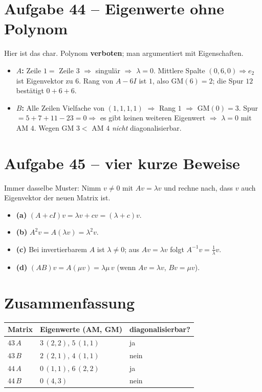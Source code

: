 \documentclass[a4paper,12pt]{article}
\begin{document}
\section*{Aufgabe 44 -- Eigenwerte ohne Polynom}

Hier ist das char. Polynom \textbf{verboten}; man argumentiert mit Eigenschaften.
\begin{itemize}[leftmargin=*, nosep]
    \item \textbf{$A$:} Zeile $1 =$ Zeile $3$ $\Rightarrow$ singul\"ar $\Rightarrow$ $\lambda = 0$. Mittlere Spalte $(0,6,0) \Rightarrow e_2$ ist Eigenvektor zu $6$. Rang von $A - 6I$ ist $1$, also GM$(6) = 2$; die Spur $12$ best\"atigt $0 + 6 + 6$.
    \item \textbf{$B$:} Alle Zeilen Vielfache von $(1,1,1,1)$ $\Rightarrow$ Rang $1$ $\Rightarrow$ GM$(0) = 3$. Spur $= 5+7+11-23 = 0 \Rightarrow$ es gibt keinen weiteren Eigenwert $\Rightarrow$ $\lambda = 0$ mit AM $4$. Wegen GM $3 <$ AM $4$ \emph{nicht} diagonalisierbar.
\end{itemize}

\section*{Aufgabe 45 -- vier kurze Beweise}

Immer dasselbe Muster: Nimm $v \neq 0$ mit $Av = \lambda v$ und rechne nach, dass $v$ auch Eigenvektor der neuen Matrix ist.
\begin{itemize}[leftmargin=*, nosep]
    \item \textbf{(a)} $(A + cI)v = \lambda v + cv = (\lambda + c)v$.
    \item \textbf{(b)} $A^2 v = A(\lambda v) = \lambda^2 v$.
    \item \textbf{(c)} Bei invertierbarem $A$ ist $\lambda \neq 0$; aus $Av = \lambda v$ folgt $A^{-1}v = \tfrac1\lambda v$.
    \item \textbf{(d)} $(AB)v = A(\mu v) = \lambda\mu\, v$ (wenn $Av = \lambda v$, $Bv = \mu v$).
\end{itemize}

\section*{Zusammenfassung}

\begin{center}
\begin{tabular}{@{}lll@{}}
\toprule
Matrix & Eigenwerte (AM, GM) & diagonalisierbar? \\
\midrule
$43\,A$ & $3\,(2,2)$, \; $5\,(1,1)$ & ja \\
$43\,B$ & $2\,(2,1)$, \; $4\,(1,1)$ & nein \\
$44\,A$ & $0\,(1,1)$, \; $6\,(2,2)$ & ja \\
$44\,B$ & $0\,(4,3)$ & nein \\
\bottomrule
\end{tabular}
\end{center}
\end{document}
